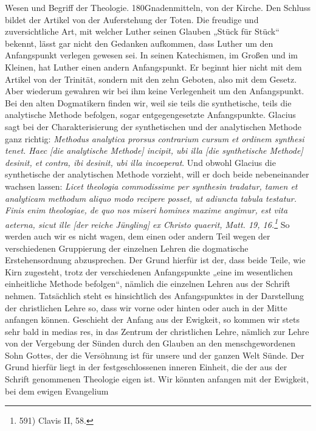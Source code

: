 Wesen und Begriff der Theologie. \hfill 180Gnadenmitteln, von der Kirche. Den Schluss bildet der Artikel von der Auferstehung der Toten. Die freudige und zuversichtliche Art, mit welcher Luther seinen Glauben „Stück für Stück“ bekennt, lässt gar nicht den Gedanken aufkommen, dass Luther um den Anfangspunkt verlegen gewesen sei. In seinen Katechismen, im Großen und im Kleinen, hat Luther einen andern Anfangspunkt. Er beginnt hier nicht mit dem Artikel von der Trinität, sondern mit den zehn Geboten, also mit dem Gesetz. Aber wiederum gewahren wir bei ihm keine Verlegenheit um den Anfangspunkt. Bei den alten Dogmatikern finden wir, weil sie teils die synthetische, teils die analytische Methode befolgen, sogar entgegengesetzte Anfangspunkte. Glacius sagt bei der Charakterisierung der synthetischen und der analytischen Methode ganz richtig: \emph{Methodus analytica prorsus contrarium cursum et ordinem synthesi tenet. Haec [die analytische Methode] incipit, ubi illa [die synthetische Methode] desinit, et contra, ibi desinit, ubi illa incoeperat}. Und obwohl Glacius die synthetische der analytischen Methode vorzieht, will er doch beide nebeneinander wachsen lassen: \emph{Licet theologia commodissime per synthesin tradatur, tamen et analyticam methodum aliquo modo recipere posset, ut adiuncta tabula testatur. Finis enim theologiae, de quo nos miseri homines maxime angimur, est vita aeterna, sicut ille [der reiche Jüngling] ex Christo quaerit, Matt. 19, 16.\footnote{591) Clavis II, 58.}} So werden auch wir es nicht wagen, dem einen oder andern Teil wegen der verschiedenen Gruppierung der einzelnen Lehren die dogmatische Erstehensordnung abzusprechen. Der Grund hierfür ist der, dass beide Teile, wie Kirn zugesteht, trotz der verschiedenen Anfangspunkte „eine im wesentlichen einheitliche Methode befolgen“, nämlich die einzelnen Lehren aus der Schrift nehmen. Tatsächlich steht es hinsichtlich des Anfangspunktes in der Darstellung der christlichen Lehre so, dass wir vorne oder hinten oder auch in der Mitte anfangen können. Geschieht der Anfang aus der Ewigkeit, so kommen wir stets sehr bald in medias res, in das Zentrum der christlichen Lehre, nämlich zur Lehre von der Vergebung der Sünden durch den Glauben an den menschgewordenen Sohn Gottes, der die Versöhnung ist für unsere und der ganzen Welt Sünde. Der Grund hierfür liegt in der festgeschlossenen inneren Einheit, die der aus der Schrift genommenen Theologie eigen ist. Wir könnten anfangen mit der Ewigkeit, bei dem ewigen Evangelium
